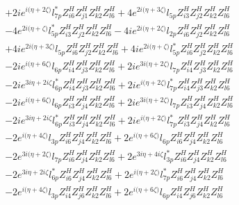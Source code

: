 \begin{align}
 &+2 i e^{i \Big(\eta +2 \zeta \Big)} l_{7p}^* Z_{{i 6}}^{H} Z_{{j 1}}^{H} Z_{{k 2}}^{H} Z_{{l 6}}^{H} +4 e^{2 i \Big(\eta +3 \zeta \Big)} l_{5p} Z_{{i 3}}^{H} Z_{{j 2}}^{H} Z_{{k 2}}^{H} Z_{{l 6}}^{H} \nonumber \\ 
 &-4 e^{2 i \Big(\eta +\zeta \Big)} l_{5p}^* Z_{{i 3}}^{H} Z_{{j 2}}^{H} Z_{{k 2}}^{H} Z_{{l 6}}^{H} -4 i e^{2 i \Big(\eta +2 \zeta \Big)} l_{2p} Z_{{i 6}}^{H} Z_{{j 2}}^{H} Z_{{k 2}}^{H} Z_{{l 6}}^{H} \nonumber \\ 
 &+4 i e^{2 i \Big(\eta +3 \zeta \Big)} l_{5p} Z_{{i 6}}^{H} Z_{{j 2}}^{H} Z_{{k 2}}^{H} Z_{{l 6}}^{H} +4 i e^{2 i \Big(\eta +\zeta \Big)} l_{5p}^* Z_{{i 6}}^{H} Z_{{j 2}}^{H} Z_{{k 2}}^{H} Z_{{l 6}}^{H} \nonumber \\ 
 &-2 i e^{i \Big(\eta +6 \zeta \Big)} l_{6p} Z_{{i 4}}^{H} Z_{{j 3}}^{H} Z_{{k 2}}^{H} Z_{{l 6}}^{H} +2 i e^{3 i \Big(\eta +2 \zeta \Big)} l_{7p} Z_{{i 4}}^{H} Z_{{j 3}}^{H} Z_{{k 2}}^{H} Z_{{l 6}}^{H} \nonumber \\ 
 &-2 i e^{3 i \eta +2 i \zeta } l_{6p}^* Z_{{i 4}}^{H} Z_{{j 3}}^{H} Z_{{k 2}}^{H} Z_{{l 6}}^{H} +2 i e^{i \Big(\eta +2 \zeta \Big)} l_{7p}^* Z_{{i 4}}^{H} Z_{{j 3}}^{H} Z_{{k 2}}^{H} Z_{{l 6}}^{H} \nonumber \\ 
 &-2 i e^{i \Big(\eta +6 \zeta \Big)} l_{6p} Z_{{i 3}}^{H} Z_{{j 4}}^{H} Z_{{k 2}}^{H} Z_{{l 6}}^{H} +2 i e^{3 i \Big(\eta +2 \zeta \Big)} l_{7p} Z_{{i 3}}^{H} Z_{{j 4}}^{H} Z_{{k 2}}^{H} Z_{{l 6}}^{H} \nonumber \\ 
 &-2 i e^{3 i \eta +2 i \zeta } l_{6p}^* Z_{{i 3}}^{H} Z_{{j 4}}^{H} Z_{{k 2}}^{H} Z_{{l 6}}^{H} +2 i e^{i \Big(\eta +2 \zeta \Big)} l_{7p}^* Z_{{i 3}}^{H} Z_{{j 4}}^{H} Z_{{k 2}}^{H} Z_{{l 6}}^{H} \nonumber \\ 
 &-2 e^{i \Big(\eta +4 \zeta \Big)} l_{3p} Z_{{i 6}}^{H} Z_{{j 4}}^{H} Z_{{k 2}}^{H} Z_{{l 6}}^{H} +2 e^{i \Big(\eta +6 \zeta \Big)} l_{6p} Z_{{i 6}}^{H} Z_{{j 4}}^{H} Z_{{k 2}}^{H} Z_{{l 6}}^{H} \nonumber \\ 
 &-2 e^{3 i \Big(\eta +2 \zeta \Big)} l_{7p} Z_{{i 6}}^{H} Z_{{j 4}}^{H} Z_{{k 2}}^{H} Z_{{l 6}}^{H} +2 e^{3 i \eta +4 i \zeta } l_{3p}^* Z_{{i 6}}^{H} Z_{{j 4}}^{H} Z_{{k 2}}^{H} Z_{{l 6}}^{H} \nonumber \\ 
 &-2 e^{3 i \eta +2 i \zeta } l_{6p}^* Z_{{i 6}}^{H} Z_{{j 4}}^{H} Z_{{k 2}}^{H} Z_{{l 6}}^{H} +2 e^{i \Big(\eta +2 \zeta \Big)} l_{7p}^* Z_{{i 6}}^{H} Z_{{j 4}}^{H} Z_{{k 2}}^{H} Z_{{l 6}}^{H} \nonumber \\ 
 &-2 e^{i \Big(\eta +4 \zeta \Big)} l_{3p} Z_{{i 4}}^{H} Z_{{j 6}}^{H} Z_{{k 2}}^{H} Z_{{l 6}}^{H} +2 e^{i \Big(\eta +6 \zeta \Big)} l_{6p} Z_{{i 4}}^{H} Z_{{j 6}}^{H} Z_{{k 2}}^{H} Z_{{l 6}}^{H} \nonumber \\ 

\end{align}
